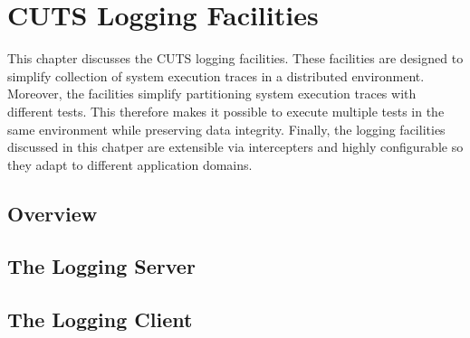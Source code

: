 
\chapter{CUTS Logging Facilities}
\label{chap:logging}

This chapter discusses the CUTS logging facilities. These facilities
are designed to simplify collection of system execution traces in 
a distributed environment. Moreover, the facilities simplify partitioning
system execution traces with different tests. This therefore makes it
possible to execute multiple tests in the same environment while 
preserving data integrity. Finally, the logging facilities discussed in
this chatper are extensible via intercepters and highly configurable so 
they adapt to different application domains.

\section{Overview}
\label{sec:logging-overview}

\section{The Logging Server}
\label{sec:logging-server}

\section{The Logging Client}
\label{sec:logging-client}

